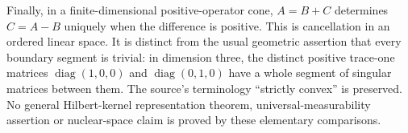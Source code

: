 \documentclass[11pt]{article}
\begin{document}
Finally, in a finite-dimensional positive-operator cone, $A=B+C$ determines $C=A-B$ uniquely when the difference is positive. This is cancellation in an ordered linear space. It is distinct from the usual geometric assertion that every boundary segment is trivial: in dimension three, the distinct positive trace-one matrices $\operatorname{diag}(1,0,0)$ and $\operatorname{diag}(0,1,0)$ have a whole segment of singular matrices between them. The source's terminology ``strictly convex'' is preserved. No general Hilbert-kernel representation theorem, universal-measurability assertion or nuclear-space claim is proved by these elementary comparisons.
\end{document}
